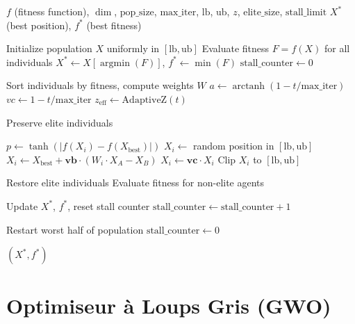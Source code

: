 \documentclass[12pt,a4paper,oneside]{report}
\begin{document}
\begin{algorithm}[H]
\caption{Algorithme SMA Am\'elior\'e}
\begin{algorithmic}[1]
\Require $f$ (fitness function), $\dim$, $\text{pop\_size}$, $\text{max\_iter}$, $\text{lb}$, $\text{ub}$, $z$, $\text{elite\_size}$, $\text{stall\_limit}$
\Ensure $X^*$ (best position), $f^*$ (best fitness)

\State Initialize population $X$ uniformly in $[\text{lb}, \text{ub}]$
\State Evaluate fitness $F = f(X)$ for all individuals
\State $X^* \gets X[\operatorname{argmin}(F)]$, $f^* \gets \min(F)$
\State $\text{stall\_counter} \gets 0$

    \State Sort individuals by fitness, compute weights $W$
    \State $a \gets \operatorname{arctanh}(1 - t/\text{max\_iter})$
    \State $vc \gets 1 - t/\text{max\_iter}$
    \State $z_{\text{eff}} \gets \text{AdaptiveZ}(t)$

    \State Preserve elite individuals

        \State $p \gets \tanh(|f(X_i) - f(X_{\text{best}})|)$
            \State $X_i \gets$ random position in $[\text{lb}, \text{ub}]$
            \State $X_i \gets X_{\text{best}} + \mathbf{vb} \cdot (W_i \cdot X_A - X_B)$
        \Else
            \State $X_i \gets \mathbf{vc} \cdot X_i$
        \EndIf
        \State Clip $X_i$ to $[\text{lb}, \text{ub}]$
    \EndFor

    \State Restore elite individuals
    \State Evaluate fitness for non-elite agents

        \State Update $X^*$, $f^*$, reset stall counter
    \Else
        \State $\text{stall\_counter} \gets \text{stall\_counter} + 1$
    \EndIf

        \State Restart worst half of population
        \State $\text{stall\_counter} \gets 0$
    \EndIf
\EndFor

\State \Return $(X^*, f^*)$
\end{algorithmic}
\end{algorithm}

\section{Optimiseur \`a Loups Gris (GWO)}
\end{document}

